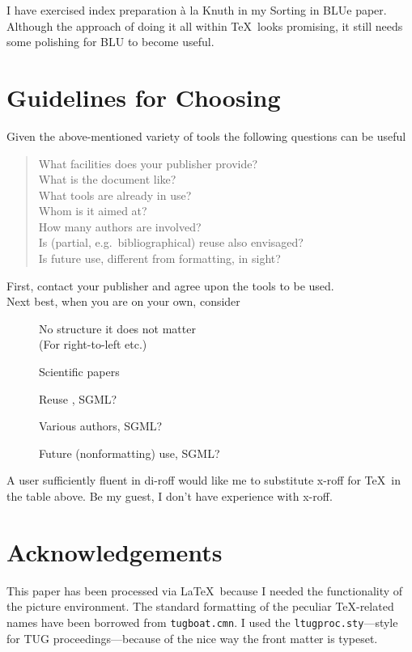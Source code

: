I have exercised index preparation \`a la Knuth in my Sorting in BLUe paper.
Although the approach of doing it all within \TeX\ looks promising,
it still needs  some polishing for BLU to become  useful.

\section{Guidelines for Choosing}
Given the above-mentioned variety of tools %
the following questions can be useful
\begin{quote}
What facilities does your publisher provide?\\
What is the document like?                           \\
What tools are already in use?                        \\
Whom is it aimed at?                               \\
How many authors are involved?                         \\
Is (partial, e.g.\  bibliographical) reuse also envisaged?\\
Is future use, different from formatting, in sight?
\end{quote}
\noindent
First, contact your publisher and agree upon the tools to be used.\\
Next best, when you are on your own, consider
\begin{description}
\item[]No structure \hfill it does not matter \\%
       (For right-to-left etc.\hfill \TeXXeT)
\item[]Scientific papers \hfill \AllTeX%
\item[]Reuse \hfill \AllTeX, SGML? %
\item[]Various authors\hfill \AllTeX, SGML? %
\item[]Future (nonformatting) use\hfill \AllTeX, SGML?
\end{description}
A user sufficiently fluent in di-roff  would like me to
substitute x-roff for \TeX\ in the table above. Be my guest, I don't
have experience with x-roff.

\section*{Acknowledgements}
This paper has been processed via \LaTeX\ because I needed the
functionality of the picture environment. The standard formatting of
the peculiar \TeX-related names have been borrowed from \verb|tugboat.cmn|.
I used the \verb|ltugproc.sty|---style for
TUG proceedings---because of the nice way the front matter
is typeset.

